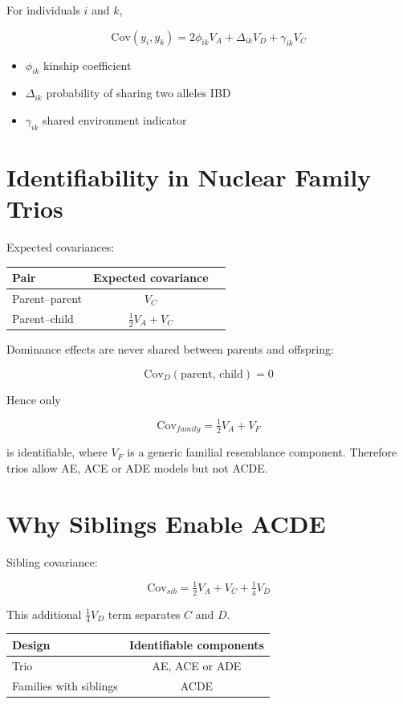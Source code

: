 \documentclass[12pt]{article}
\begin{document}
For individuals $i$ and $k$,

\[
\text{Cov}(y_i,y_k)=
2\phi_{ik}V_A + \Delta_{ik}V_D + \gamma_{ik}V_C
\]

\begin{itemize}
\item $\phi_{ik}$ kinship coefficient
\item $\Delta_{ik}$ probability of sharing two alleles IBD
\item $\gamma_{ik}$ shared environment indicator
\end{itemize}

\section{Identifiability in Nuclear Family Trios}

Expected covariances:

\begin{center}
\begin{tabular}{lcc}
\toprule
Pair & Expected covariance \\ \midrule
Parent--parent & $V_C$ \\
Parent--child  & $\tfrac12 V_A + V_C$ \\
\bottomrule
\end{tabular}
\end{center}

Dominance effects are never shared between parents and offspring:

\[
\text{Cov}_D(\text{parent, child}) = 0
\]

Hence only

\[
\text{Cov}_{family} = \tfrac12 V_A + V_F
\]

is identifiable, where $V_F$ is a generic familial resemblance
component. Therefore trios allow AE, ACE or ADE models but not ACDE.

\section{Why Siblings Enable ACDE}

Sibling covariance:

\[
\text{Cov}_{sib}=\tfrac12 V_A + V_C + \tfrac14 V_D
\]

This additional $\tfrac14 V_D$ term separates $C$ and $D$.

\begin{center}
\begin{tabular}{lc}
\toprule
Design & Identifiable components \\ \midrule
Trio & AE, ACE or ADE \\
Families with siblings & ACDE \\
\bottomrule
\end{tabular}
\end{center}
\end{document}
